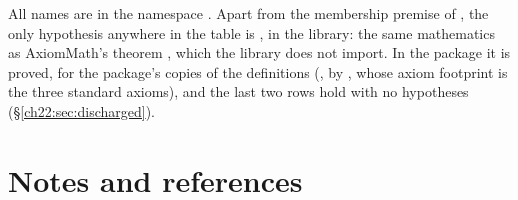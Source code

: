 All names are in the namespace .  Apart from the membership premise of , the only
hypothesis anywhere in the table is , in the library: the same mathematics as AxiomMath's theorem
, which the library does not import.  In the package  it is proved, for the
package's copies of the definitions (, by , whose axiom footprint is the three
standard axioms), and the last two rows hold with no hypotheses (\S\ref{ch22:sec:discharged}).

\section{Notes and references}\label{ch22:sec:notes}

